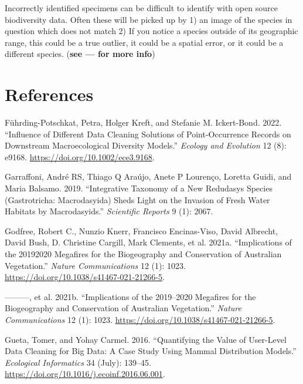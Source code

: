 \documentclass[
  letterpaper,
  DIV=11,
  numbers=noendperiod,
  oneside]{scrreprt}
\newlength{\cslhangindent}
\newlength{\cslentryspacingunit} %
\newenvironment{CSLReferences}[2] %
 {%
  \setlength{\parindent}{0pt}
  \ifodd #1
  \let\oldpar\par
  \def\par{\hangindent=\cslhangindent\oldpar}
  \fi
  \setlength{\parskip}{#2\cslentryspacingunit}
 }%
 {}
\begin{document}
Incorrectly identified specimens can be difficult to identify with open
source biodiversity data. Often these will be picked up by 1) an image
of the species in question which does not match 2) If you notice a
species outside of its geographic range, this could be a true outlier,
it could be a spatial error, or it could be a different species.
(\textbf{see --- for more info})


\hypertarget{sec-references}{%
\chapter{References}\label{sec-references}}

\hypertarget{refs}{}
\begin{CSLReferences}{1}{0}
\leavevmode{}%
Führding-Potschkat, Petra, Holger Kreft, and Stefanie M. Ickert-Bond.
2022. {``Influence of Different Data Cleaning Solutions of
Point-Occurrence Records on Downstream Macroecological Diversity
Models.''} \emph{Ecology and Evolution} 12 (8): e9168.
\url{https://doi.org/10.1002/ece3.9168}.

\leavevmode{}%
Garraffoni, André RS, Thiago Q Araújo, Anete P Lourenço, Loretta Guidi,
and Maria Balsamo. 2019. {``Integrative Taxonomy of a New Redudasys
Species (Gastrotricha: Macrodasyida) Sheds Light on the Invasion of
Fresh Water Habitats by Macrodasyids.''} \emph{Scientific Reports} 9
(1): 2067.

\leavevmode{}%
Godfree, Robert C., Nunzio Knerr, Francisco Encinas-Viso, David
Albrecht, David Bush, D. Christine Cargill, Mark Clements, et al. 2021a.
{``Implications of the 2019{\textendash}2020 Megafires for the
Biogeography and Conservation of Australian Vegetation.''} \emph{Nature
Communications} 12 (1): 1023.
\url{https://doi.org/10.1038/s41467-021-21266-5}.

\leavevmode{}%
---------, et al. 2021b. {``Implications of the 2019--2020 Megafires for
the Biogeography and Conservation of {Australian} Vegetation.''}
\emph{Nature Communications} 12 (1): 1023.
\url{https://doi.org/10.1038/s41467-021-21266-5}.

\leavevmode{}%
Gueta, Tomer, and Yohay Carmel. 2016. {``Quantifying the Value of
User-Level Data Cleaning for Big Data: {A} Case Study Using Mammal
Distribution Models.''} \emph{Ecological Informatics} 34 (July):
139--45. \url{https://doi.org/10.1016/j.ecoinf.2016.06.001}.


\end{CSLReferences}
\end{document}
